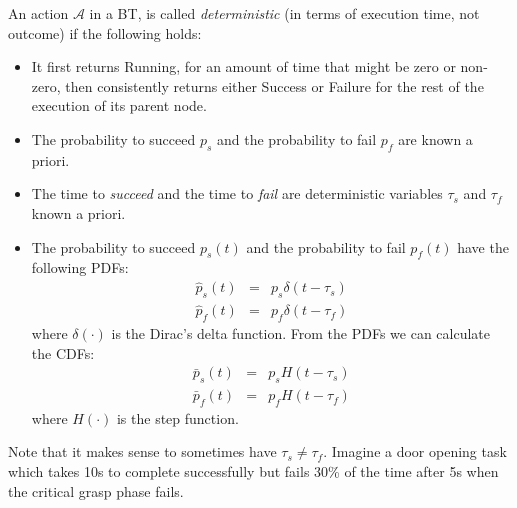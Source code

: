 \begin{definition}
\label{stoch:def:det}
An action $\mathcal{A}$ in a BT, is called \emph{deterministic} (in terms of execution time, not outcome) if the following holds:
\begin{itemize}
\item
It first returns Running, for an amount of time that might be zero or non-zero, then consistently returns either Success or Failure for the rest of the execution of its parent node.
\item The probability to succeed $p_s$ and the probability to fail $p_f$ are known a priori.
\item The time to \emph{succeed} and the time to \emph{fail} are deterministic variables $\tau_s$ and $\tau_f$ known a priori.
\item The probability to succeed  $p_s(t)$ and the probability to fail  $p_f(t)$ have the following PDFs:
\begin{eqnarray}
\hat p_s(t) &=& p_s  \delta(t-\tau_s)\label{stoch:eq:d1}  \\
\hat p_f(t) &=&  p_f  \delta(t-\tau_f)  \label{stoch:eq:d2}
\end{eqnarray}
where $\delta(\cdot)$ is the Dirac's delta function. From the PDFs we can calculate the CDFs:
\begin{eqnarray}
\bar p_s(t) &=& p_s  H(t-\tau_s)\label{stoch:eq:h1}  \\
\bar p_f(t) &=&  p_f  H(t-\tau_f)  \label{stoch:eqh2}
\end{eqnarray}
where $H(\cdot)$ is the step function.

\end{itemize} 
\end{definition}

\begin{remark}
 Note that it makes sense to sometimes have $\tau_s \neq \tau_f$. Imagine a door opening task which takes 10s to complete successfully but fails 30\% of the time after 5s when the critical grasp phase fails.
\end{remark}

